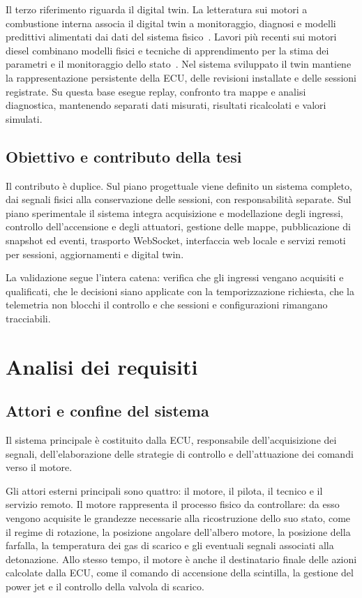 \documentclass{article}
\begin{document}
Il terzo riferimento riguarda il digital twin. La letteratura sui motori a
combustione interna associa il digital twin a monitoraggio, diagnosi e modelli
predittivi alimentati dai dati del sistema fisico~\cite{tran_dt}. Lavori più
recenti sui motori diesel combinano modelli fisici e tecniche di apprendimento
per la stima dei parametri e il monitoraggio dello stato~\cite{nath_dt}. Nel
sistema sviluppato il twin mantiene la rappresentazione persistente della ECU,
delle revisioni installate e delle sessioni registrate. Su questa base esegue
replay, confronto tra mappe e analisi diagnostica, mantenendo separati dati
misurati, risultati ricalcolati e valori simulati.

\subsection{Obiettivo e contributo della tesi}

Il contributo è duplice. Sul piano progettuale viene definito un sistema
completo, dai segnali fisici alla conservazione delle sessioni, con responsabilità
separate. Sul piano sperimentale il sistema integra acquisizione e modellazione
degli ingressi, controllo dell'accensione e degli attuatori, gestione delle
mappe, pubblicazione di snapshot ed eventi, trasporto WebSocket, interfaccia web
locale e servizi remoti per sessioni, aggiornamenti e digital twin.

La validazione segue l'intera catena: verifica che gli ingressi vengano
acquisiti e qualificati, che le decisioni siano applicate con la temporizzazione
richiesta, che la telemetria non blocchi il controllo e che sessioni e
configurazioni rimangano tracciabili.

\section{Analisi dei requisiti}
\label{sec:requisiti}

\subsection{Attori e confine del sistema}

Il sistema principale è costituito dalla ECU, responsabile dell'acquisizione dei segnali, dell'elaborazione delle strategie di controllo e dell'attuazione dei comandi verso il motore.

Gli attori esterni principali sono quattro: il motore, il pilota, il tecnico e il servizio remoto. Il motore rappresenta il processo fisico da controllare: da esso vengono acquisite le grandezze necessarie alla ricostruzione dello suo stato, come il regime di rotazione, la posizione angolare dell'albero motore, la posizione della farfalla, la temperatura dei gas di scarico e gli eventuali segnali associati alla detonazione. Allo stesso tempo, il motore è anche il destinatario finale delle azioni calcolate dalla ECU, come il comando di accensione della scintilla, la gestione del power jet e il controllo della valvola di scarico.
\end{document}
